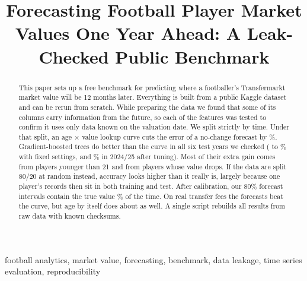 \documentclass[conference]{IEEEtran}
\begin{document}
\title{Forecasting Football Player Market Values One Year Ahead: A Leak-Checked Public Benchmark}

\ifanonymous
\author{}                %
\else
\author{
}
\fi

\maketitle

\begin{abstract}
This paper sets up a free benchmark for predicting where a footballer's Transfermarkt market value will be 12 months later. Everything is built from a public Kaggle dataset and can be rerun from scratch. While preparing the data we found that some of its columns carry information from the future, so each of the \NFeatures{} features was tested to confirm it uses only data known on the valuation date. We split strictly by time. Under that split, an age $\times$ value lookup curve cuts the error of a no-change forecast by \SkillCurve\%. Gradient-boosted trees do better than the curve in all six test years we checked (\RollVsCurveMin{} to \RollVsCurveMax\% with fixed settings, and \VsCurveLGB\% \VsCurveLGBCI{} in 2024/25 after tuning). Most of their extra gain comes from players younger than 21 and from players whose value drops. If the data are split 80/20 at random instead, accuracy looks higher than it really is, largely because one player's records then sit in both training and test. After calibration, our 80\% forecast intervals contain the true value \IntCovCal\% of the time. On real transfer fees the forecasts beat the curve, but age by itself does about as well. A single script rebuilds all results from raw data with known checksums.
\end{abstract}

\begin{IEEEkeywords}
football analytics, market value, forecasting, benchmark, data leakage, time series evaluation, reproducibility
\end{IEEEkeywords}

\end{document}
